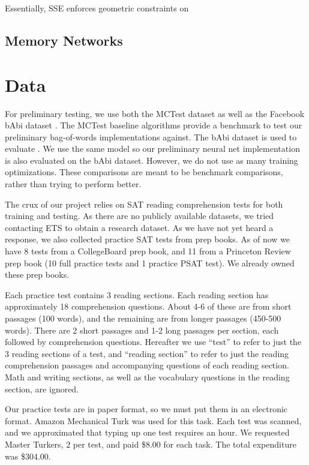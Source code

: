 \documentclass[pageno]{jpaper}
\begin{document}
Essentially, SSE enforces geometric constraints on

\subsection{Memory Networks}
\label{Memory Networks}

\section{Data}
\label{Data}

For preliminary testing, we use both the MCTest \cite{Richardson2013} dataset as
well as the Facebook bAbi dataset \cite{Weston2015}. The MCTest baseline
algorithms provide a benchmark to test our preliminary bag-of-words
implementations against. The bAbi dataset is used to evaluate
\cite{Sukhbaatar2015}. We use the same model so our preliminary neural net
implementation is also evaluated on the bAbi dataset. However, we do not use as
many training optimizations. These comparisons are meant to be benchmark
comparisons, rather than trying to perform better.

The crux of our project relies on SAT reading comprehension tests for both
training and testing. As there are no publicly available datasets, we tried
contacting ETS to obtain a research dataset. As we have not yet heard a response,
we also collected practice SAT tests from prep books. As of now we have 8 tests
from a CollegeBoard prep book, and 11 from a Princeton Review prep book (10 full
practice tests and 1 practice PSAT test). We already owned these prep books.

Each practice test contains 3 reading sections. Each reading section has
approximately 18 comprehension questions. About 4-6 of these are from short
passages (100 words), and the remaining are from longer passages (450-500
words). There are 2 short passages and 1-2 long passages per section, each
followed by comprehension questions. Hereafter we use ``test'' to refer to just
the 3 reading sections of a test, and ``reading section'' to refer to just the
reading comprehension passages and accompanying questions of each reading
section. Math and writing sections, as well as the vocabulary questions in the
reading section, are ignored.

Our practice tests are in paper format, so we must put them in an electronic
format. Amazon Mechanical Turk was used for this task. Each test was scanned,
and we approximated that typing up one test requires an hour. We requested
Master Turkers, 2 per test, and paid \$8.00 for each task. The total expenditure
was \$304.00.
\end{document}
